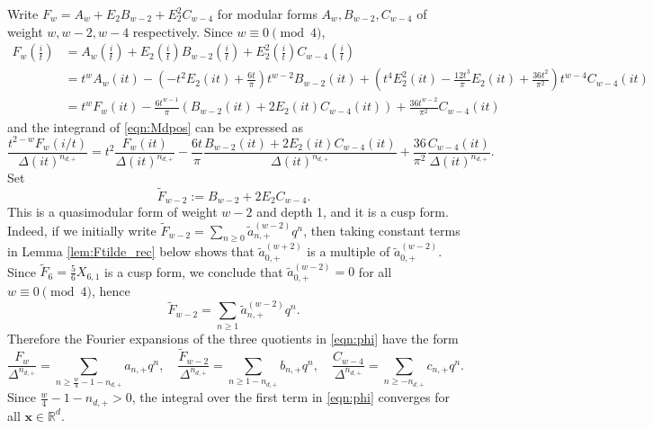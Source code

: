 \documentclass[10pt,reqno]{amsproc}
\newcommand{\wtilde}{\widetilde}
\newcommand{\bR}{\mathbb{R}}
\newcommand{\bx}{\mathbf{x}}
\newcommand{\1}{\mathds{1}}	%
\theoremstyle{definition}
\theoremstyle{remark}
\begin{document}
Write $F_w = A_w + E_2 B_{w - 2} + E_2^2 C_{w-4}$ for modular forms $A_w, B_{w-2}, C_{w-4}$ of weight $w, w-2, w-4$ respectively.
Since $w \equiv 0 \pmod{4}$,
\begin{align*}
    F_w\left(\frac{i}{t}\right) &= A_w\left(\frac{i}{t}\right) + E_2\left(\frac{i}{t}\right) B_{w-2}\left(\frac{i}{t}\right) + E_2^2\left(\frac{i}{t}\right) C_{w-4}\left(\frac{i}{t}\right) \\
    &= t^{w} A_w(it) - \left(-t^2 E_2(it) + \frac{6t}{\pi}\right) t^{w-2} B_{w-2}(it) + \left(t^4 E_2^2(it) - \frac{12t^3}{\pi} E_2(it) + \frac{36t^2}{\pi^2}\right) t^{w-4} C_{w-4}(it) \\
    &= t^w F_w(it) - \frac{6t^{w-1}}{\pi} (B_{w-2}(it) + 2 E_2(it) C_{w-4}(it)) + \frac{36t^{w-2}}{\pi^2} C_{w-4}(it)
\end{align*}
and the integrand of \eqref{eqn:Mdpos} can be expressed as
\begin{equation}
    \label{eqn:phi}
    \frac{t^{2-w} F_w\left(i / t\right)}{\Delta(it)^{n_{d,+}}} = t^2 \frac{F_w(it)}{\Delta(it)^{n_{d,+}}} - \frac{6t}{\pi} \frac{B_{w-2}(it) + 2 E_2(it) C_{w-4}(it)}{\Delta(it)^{n_{d,+}}} + \frac{36}{\pi^2} \frac{C_{w-4}(it)}{\Delta(it)^{n_{d,+}}}.
\end{equation}
Set
\begin{equation}
    \label{eqn:Ftilde}
    \widetilde{F}_{w-2} := B_{w-2} + 2 E_2 C_{w-4}.
\end{equation}
This is a quasimodular form of weight $w-2$ and depth 1, and it is a cusp form. Indeed, if we initially write $\widetilde{F}_{w-2}=\sum_{n\geq 0}\tilde a_{n,+}^{(w-2)}q^n$, then taking constant terms in Lemma \ref{lem:Ftilde_rec} below shows that $\tilde{a}_{0,+}^{(w+2)}$ is a multiple of $\tilde{a}_{0,+}^{(w-2)}$.
Since $\wtilde{F}_6 = \frac{5}{6} X_{6,1}$ is a cusp form, we conclude that $\tilde{a}_{0,+}^{(w-2)} = 0$ for all $w \equiv 0 \pmod{4}$, hence
\[
    \widetilde{F}_{w-2}=\sum_{n\geq 1}\tilde a_{n,+}^{(w-2)}q^n.
\]
Therefore the Fourier expansions of the three quotients in \eqref{eqn:phi} have the form
\begin{equation}
    \label{eqn:qexp_integrand}
    \frac{F_{w}}{\Delta^{n_{d,+}}} = \sum_{n \geq \frac{w}{4}-1-n_{d,+}} a_{n,+} q^n, \quad
    \frac{\widetilde F_{w-2}}{\Delta^{n_{d,+}}} = \sum_{n \ge 1-n_{d,+}} b_{n,+} q^n, \quad \frac{C_{w-4}}{\Delta^{n_{d,+}}} = \sum_{n \ge - n_{d,+}} c_{n,+} q^n.
\end{equation}
Since $\frac{w}{4}-1-n_{d,+} > 0$, the integral over the first term in \eqref{eqn:phi} converges for all $\bx \in \bR^d$.
\end{document}
